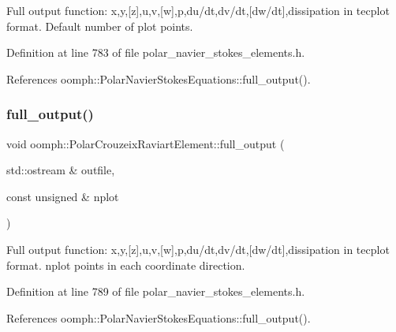 Full output function\+: x,y,\mbox{[}z\mbox{]},u,v,\mbox{[}w\mbox{]},p,du/dt,dv/dt,\mbox{[}dw/dt\mbox{]},dissipation in tecplot format. Default number of plot points. 



Definition at line 783 of file polar\+\_\+navier\+\_\+stokes\+\_\+elements.\+h.



References oomph\+::\+Polar\+Navier\+Stokes\+Equations\+::full\+\_\+output().

\mbox{\label{classoomph_1_1PolarCrouzeixRaviartElement_a92da79ca7ed2c314650ad5a54b7878e8}} 
\subsubsection{\texorpdfstring{full\+\_\+output()}{full\_output()}\hspace{0.1cm}{\footnotesize\ttfamily [2/2]}}
{\footnotesize\ttfamily void oomph\+::\+Polar\+Crouzeix\+Raviart\+Element\+::full\+\_\+output (\begin{DoxyParamCaption}\item[{std\+::ostream \&}]{outfile,  }\item[{const unsigned \&}]{nplot }\end{DoxyParamCaption})\hspace{0.3cm}{\ttfamily [inline]}}



Full output function\+: x,y,\mbox{[}z\mbox{]},u,v,\mbox{[}w\mbox{]},p,du/dt,dv/dt,\mbox{[}dw/dt\mbox{]},dissipation in tecplot format. nplot points in each coordinate direction. 



Definition at line 789 of file polar\+\_\+navier\+\_\+stokes\+\_\+elements.\+h.



References oomph\+::\+Polar\+Navier\+Stokes\+Equations\+::full\+\_\+output().

\mbox{\label{classoomph_1_1PolarCrouzeixRaviartElement_a575257c6dc7b44e56c687066cbda3791}} 
